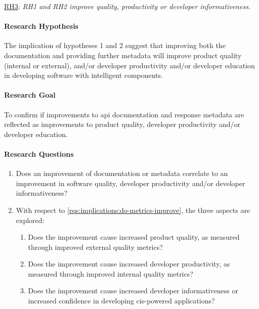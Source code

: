 \begin{titled-frame}{\underline{RH3}: \textit{RH1 and RH2 improve quality,  productivity or developer informativeness.} }
\vspace{-12pt}
\paragraph{Research Hypothesis}
The implication of hypotheses 1 and 2 suggest that improving both the documentation and providing further metadata will improve product quality (internal or external), and/or developer productivity and/or developer education in developing software with intelligent components.

\paragraph{Research Goal}
 To confirm if improvements to \gls{api} documentation and response metadata  are reflected as improvements to product quality, developer productivity and/or developer education.

\paragraph{Research Questions}
\begin{enumerate}[label=\textbf{RQ3.\arabic*.}, ref=RQ3.\arabic*, leftmargin=3.5\parindent, rightmargin=1\parindent]
  \item  Does an improvement of documentation or metadata correlate to an improvement in software quality, developer productivity and/or developer informativeness?
  \label{rqs:implications:do-metrics-improve}
  
  \item With respect to \ref{rqs:implications:do-metrics-improve}, the three aspects are explored:
  \begin{enumerate}
  \item Does the improvement cause increased product quality, as measured through improved external quality metrics?
  \item Does the improvement cause increased developer productivity, as measured through improved internal quality metrics?
  \item Does the improvement cause increased developer informativeness or increased confidence in developing \gls{cis}-powered applications?
  \end{enumerate}
  \label{rqs:implications:aspects}  
\end{enumerate}


\end{titled-frame}
